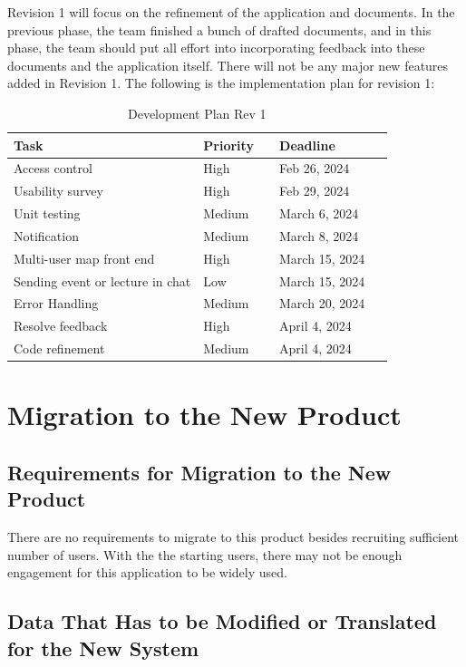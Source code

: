 \documentclass[12pt]{article}
\begin{document}
Revision 1 will focus on the refinement of the application and documents. In the previous phase, the team finished a bunch of drafted documents, and in this phase, the team should put all effort into incorporating feedback into these documents and the application itself. There will not be any major new features added in Revision 1. The following is the implementation plan for revision 1:\\
\begin{table}[H]
    \centering
    \begin{tabular}{|p{0.5\linewidth} | p{0.2\linewidth}| p{0.3\linewidth} |}
    \hline
    \textbf{Task} & \textbf{Priority} & \textbf{Deadline}\\
    \hline
    Access control & High & Feb 26, 2024 \\
    \hline
    Usability survey & High & Feb 29,  2024 \\
    \hline
    Unit testing & Medium & March 6, 2024 \\
	\hline
    Notification & Medium & March 8, 2024 \\
    \hline
    Multi-user map front end & High & March 15, 2024 \\
    \hline
    Sending event or lecture in chat & Low & March 15, 2024 \\
    \hline
    Error Handling & Medium & March 20, 2024 \\
    \hline
    Resolve feedback & High & April 4, 2024\\
    \hline
	Code refinement & Medium & April 4, 2024\\
    \hline
    \end{tabular}
    \caption{Development Plan Rev 1}
    \label{DevelopmentPlan1}
\end{table}

\section{Migration to the New Product}
\subsection{Requirements for Migration to the New Product}

\qquad There are no requirements to migrate to this product besides recruiting sufficient number of users.
With the the starting users, there may not be enough engagement for this application to be widely used.

\subsection{Data That Has to be Modified or Translated for the New System}
\end{document}
